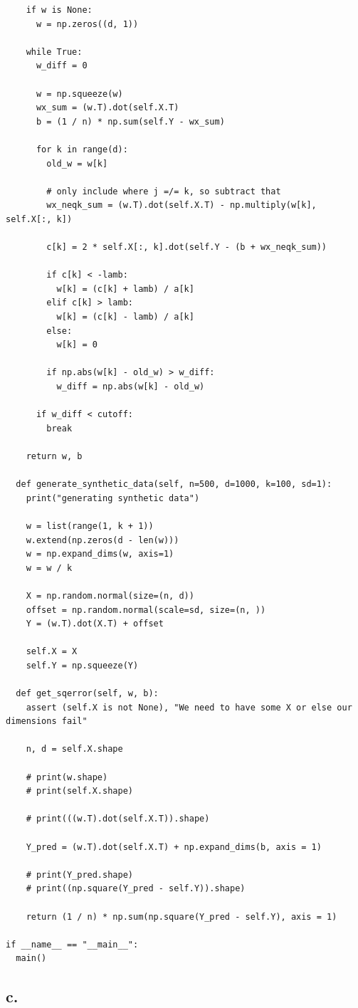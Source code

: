 \documentclass{article}
\newcommand{\1}{\mathbf{1}}
\begin{document}
{\begin{verbatim}
    if w is None:
      w = np.zeros((d, 1))

    while True:
      w_diff = 0

      w = np.squeeze(w)
      wx_sum = (w.T).dot(self.X.T)
      b = (1 / n) * np.sum(self.Y - wx_sum)
      
      for k in range(d):
        old_w = w[k]

        # only include where j =/= k, so subtract that
        wx_neqk_sum = (w.T).dot(self.X.T) - np.multiply(w[k], self.X[:, k])

        c[k] = 2 * self.X[:, k].dot(self.Y - (b + wx_neqk_sum))

        if c[k] < -lamb:
          w[k] = (c[k] + lamb) / a[k]
        elif c[k] > lamb:
          w[k] = (c[k] - lamb) / a[k]
        else: 
          w[k] = 0

        if np.abs(w[k] - old_w) > w_diff:
          w_diff = np.abs(w[k] - old_w)

      if w_diff < cutoff:
        break
    
    return w, b

  def generate_synthetic_data(self, n=500, d=1000, k=100, sd=1):
    print("generating synthetic data")

    w = list(range(1, k + 1))
    w.extend(np.zeros(d - len(w)))
    w = np.expand_dims(w, axis=1)
    w = w / k
    
    X = np.random.normal(size=(n, d))
    offset = np.random.normal(scale=sd, size=(n, ))
    Y = (w.T).dot(X.T) + offset

    self.X = X
    self.Y = np.squeeze(Y)

  def get_sqerror(self, w, b):
    assert (self.X is not None), "We need to have some X or else our dimensions fail"

    n, d = self.X.shape

    # print(w.shape)
    # print(self.X.shape)

    # print(((w.T).dot(self.X.T)).shape)

    Y_pred = (w.T).dot(self.X.T) + np.expand_dims(b, axis = 1)
    
    # print(Y_pred.shape)
    # print((np.square(Y_pred - self.Y)).shape)

    return (1 / n) * np.sum(np.square(Y_pred - self.Y), axis = 1)

if __name__ == "__main__":
  main()

\end{verbatim}

\subsection*{c.}

}
\end{document}
